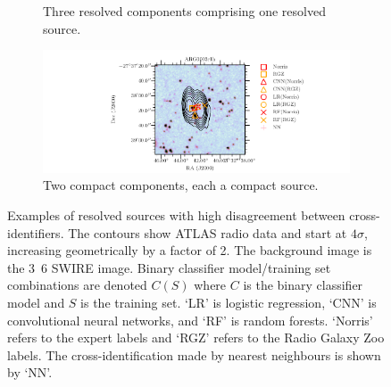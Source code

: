 \begin{figure}
\begin{subfigure}{0.45\textwidth}
            \caption{Three resolved components comprising one resolved source.}
        \end{subfigure}
        \begin{subfigure}{0.9\textwidth}
            \includegraphics[width=\textwidth]{atlas-images/examples_all/example_sorted_0_306.pdf}
            \caption{Two compact components, each a compact source.}
        \end{subfigure}
        \caption[Examples of resolved sources with high disagreement between cross-identifiers.]{\label{fig:examples} Examples of resolved sources with high disagreement between cross-identifiers. The contours show ATLAS radio data and start at $4\sigma$, increasing geometrically by a factor of 2. The background image is the \unit{3.6}{\micro\meter} SWIRE image. Binary classifier model/training set combinations are denoted $C(S)$ where $C$ is the binary classifier model and $S$ is the training set. `LR' is logistic regression, `CNN' is convolutional neural networks, and `RF' is random forests. `Norris' refers to the expert labels and `RGZ' refers to the Radio Galaxy Zoo labels. The cross-identification made by nearest neighbours is shown by `NN'.}
    \end{figure}


\unappendix
